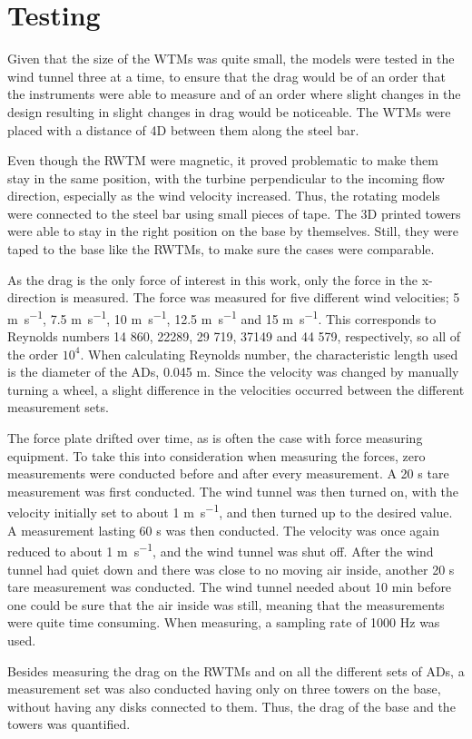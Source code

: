 \section{Testing}
Given that the size of the \gls{WTM}s was quite small, the models were tested in the wind tunnel three at a time, to ensure that the drag would be of an order that the instruments were able to measure and of an order where slight changes in the design resulting in slight changes in drag would be noticeable. The \gls{WTM}s were placed with a distance of 4D between them along the steel bar.  %

Even though the \gls{RWTM} were magnetic, it proved problematic to make them stay in the same position, with the turbine perpendicular to the incoming flow direction, especially as the wind velocity increased. Thus, the rotating models were connected to the steel bar using small pieces of tape. The 3D printed towers were able to stay in the right position on the base by themselves. Still, they were taped to the base like the \gls{RWTM}s, to make sure the cases were comparable. 

As the drag is the only force of interest in this work, only the force in the x-direction is measured. The force was measured for five different wind velocities; 5 \si{\m\per\s}, 7.5 \si{\m\per\s}, 10 \si{\m\per\s}, 12.5 \si{\m\per\s} and 15 \si{\m\per\s}. This corresponds to Reynolds numbers 14 860, 22289, 29 719, 37149 and 44 579, respectively, so all of the order $10^4$. When calculating Reynolds number, the characteristic length used is the diameter of the \gls{AD}s, 0.045 \si{\m}. Since the velocity was changed by manually turning a wheel, a slight difference in the velocities occurred between the different measurement sets. 

The force plate drifted over time, as is often the case with force measuring equipment. To take this into consideration when measuring the forces, zero measurements were conducted before and after every measurement. A 20 \si{\s} tare measurement was first conducted. The wind tunnel was then turned on, with the velocity initially set to about 1 \si{\m\per\s}, and then turned up to the desired value. A measurement lasting 60 \si{s} was then conducted. The velocity was once again reduced to about 1 \si{\m\per\s}, and the wind tunnel was shut off. After the wind tunnel had quiet down and there was close to no moving air inside, another 20 \si{\s} tare measurement was conducted. The wind tunnel needed about 10 \si{\minute} before one could be sure that the air inside was still, meaning that the measurements were quite time consuming. When measuring, a sampling rate of 1000 \si{\hertz} was used.  

Besides measuring the drag on the \gls{RWTM}s and on all the different sets of \gls{AD}s, a measurement set was also conducted having only on three towers on the base, without having any disks connected to them. Thus, the drag of the base and the towers was quantified. 

